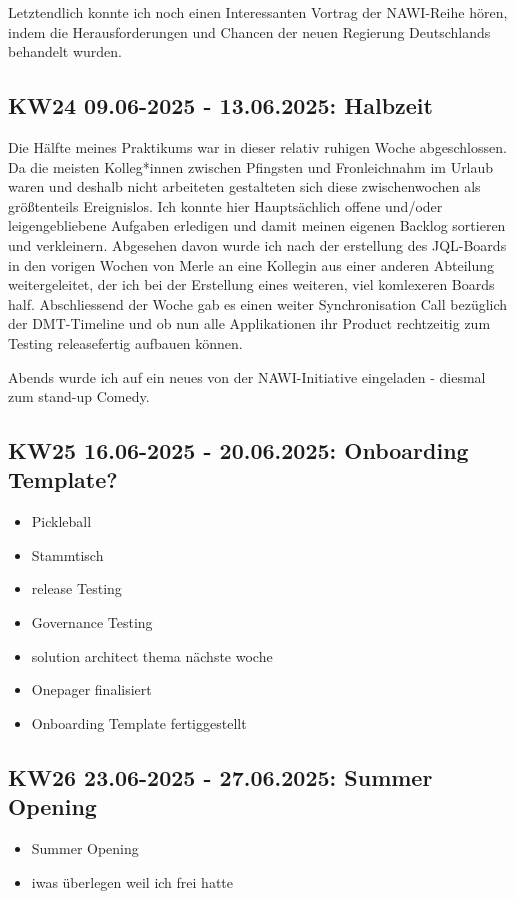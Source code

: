 Letztendlich konnte ich noch einen Interessanten Vortrag der \ac{NAWI}-Reihe hören, indem die Herausforderungen und Chancen der neuen Regierung Deutschlands behandelt wurden.


\subsection{KW24 09.06-2025 - 13.06.2025: Halbzeit}
Die Hälfte meines Praktikums war in dieser relativ ruhigen Woche abgeschlossen. 
Da die meisten Kolleg*innen zwischen Pfingsten und Fronleichnahm im Urlaub waren und deshalb nicht arbeiteten gestalteten sich diese zwischenwochen als größtenteils Ereignislos.
Ich konnte hier Hauptsächlich offene und/oder leigengebliebene Aufgaben erledigen und damit meinen eigenen Backlog sortieren und verkleinern.
Abgesehen davon wurde ich nach der erstellung des \ac{JQL}-Boards in den vorigen Wochen von Merle an eine Kollegin aus einer anderen Abteilung weitergeleitet, der ich bei der Erstellung eines weiteren, viel komlexeren Boards half.
Abschliessend der Woche gab es einen weiter Synchronisation Call bezüglich der \ac{DMT}-Timeline und ob nun alle Applikationen ihr Product rechtzeitig zum Testing releasefertig aufbauen können.

Abends wurde ich auf ein neues von der \ac{NAWI}-Initiative eingeladen - diesmal zum stand-up Comedy.


\subsection{KW25 16.06-2025 - 20.06.2025: Onboarding Template?} %
\begin{itemize}
  \item Pickleball
  \item Stammtisch
  \item release Testing
  \item Governance Testing
  \item solution architect thema nächste woche
  \item Onepager finalisiert
  \item Onboarding Template fertiggestellt
\end{itemize}


\subsection{KW26 23.06-2025 - 27.06.2025: Summer Opening}
\begin{itemize}
  \item Summer Opening
  \item iwas überlegen weil ich frei hatte
\end{itemize}


